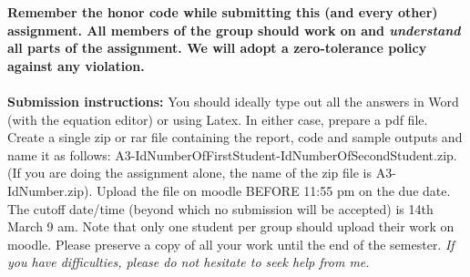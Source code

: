 \documentclass[11pt]{article}
\begin{document}
\maketitle

\textbf{Remember the honor code while submitting this (and every other) assignment. All members of the group should work on and \emph{understand} all parts of the assignment. We will adopt a \textbf{zero-tolerance policy} against any violation.}
\\
\\
\textbf{Submission instructions:} You should ideally type out all the answers in Word (with the equation editor) or using Latex. In either case, prepare a pdf file. Create a single zip or rar file containing the report, code and sample outputs and name it as follows: A3-IdNumberOfFirstStudent-IdNumberOfSecondStudent.zip. (If you are doing the assignment alone, the name of the zip file is A3-IdNumber.zip). Upload the file on moodle BEFORE 11:55 pm on the due date. The cutoff date/time (beyond which no submission will be accepted) is 14th March 9 am. Note that only one student per group should upload their work on moodle. Please preserve a copy of all your work until the end of the semester. \emph{If you have difficulties, please do not hesitate to seek help from me.} 
\end{document}
